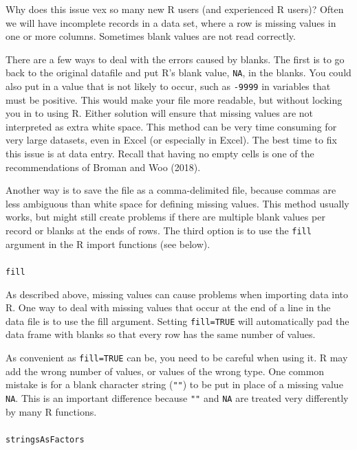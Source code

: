 \documentclass[
  13,
  letterpaper,
]{report}
\makeatletter
\let\oldparagraph\paragraph
\renewcommand{\paragraph}{
    \@ifstar
      \xxxParagraphStar
      \xxxParagraphNoStar
  }
\newcommand{\xxxParagraphStar}[1]{\oldparagraph*{#1}\mbox{}}
\newcommand{\xxxParagraphNoStar}[1]{\oldparagraph{#1}\mbox{}}
\makeatother
\begin{document}
Why does this issue vex so many new R users (and experienced R users)?
Often we will have incomplete records in a data set, where a row is
missing values in one or more columns. Sometimes blank values are not
read correctly.

There are a few ways to deal with the errors caused by blanks. The first
is to go back to the original datafile and put R's blank value,
\texttt{NA}, in the blanks. You could also put in a value that is not
likely to occur, such as \texttt{-9999} in variables that must be
positive. This would make your file more readable, but without locking
you in to using R. Either solution will ensure that missing values are
not interpreted as extra white space. This method can be very time
consuming for very large datasets, even in Excel (or especially in
Excel). The best time to fix this issue is at data entry. Recall that
having no empty cells is one of the recommendations of Broman and Woo
(2018).

Another way is to save the file as a comma-delimited file, because
commas are less ambiguous than white space for defining missing values.
This method usually works, but might still create problems if there are
multiple blank values per record or blanks at the ends of rows. The
third option is to use the \texttt{fill} argument in the R import
functions (see below).

\paragraph{\texorpdfstring{\texttt{fill}}{fill}}\label{fill}

As described above, missing values can cause problems when importing
data into R. One way to deal with missing values that occur at the end
of a line in the data file is to use the fill argument. Setting
\texttt{fill=TRUE} will automatically pad the data frame with blanks so
that every row has the same number of values.

As convenient as \texttt{fill=TRUE} can be, you need to be careful when
using it. R may add the wrong number of values, or values of the wrong
type. One common mistake is for a blank character string (\texttt{""})
to be put in place of a missing value \texttt{NA}. This is an important
difference because \texttt{""} and \texttt{NA} are treated very
differently by many R functions.

\paragraph{\texorpdfstring{\texttt{stringsAsFactors}}{stringsAsFactors}}\label{stringsasfactors}
\end{document}

